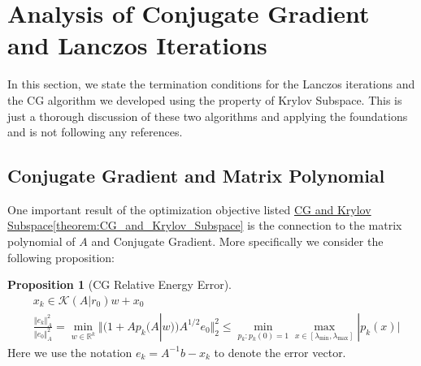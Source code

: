 \documentclass[]{article}
\theoremstyle{definition}
\newtheorem{prop}{Proposition}[section]  %
\begin{document}
\section{Analysis of Conjugate Gradient and Lanczos Iterations}
    In this section, we state the termination conditions for the Lanczos iterations and the CG algorithm we developed using the property of Krylov Subspace. This is just a thorough discussion of these two algorithms and applying the foundations and is not following any references.
    \subsection{Conjugate Gradient and Matrix Polynomial}
        One important result of the optimization objective listed \hyperref[theorem:CG_and_Krylov_Subspace]{CG and Krylov Subspace\ref*{theorem:CG_and_Krylov_Subspace}} is the connection to the matrix polynomial of $A$ and Conjugate Gradient. More specifically we consider the following proposition: 
        \begin{prop}[CG Relative Energy Error]\label{prop:CG_Relative_Energy Error}
            \begin{align}
                & x_k \in \mathcal{K}(A|r_0)w + x_0
                \\
                & \frac{\Vert e_k\Vert_A^2}{\Vert e_0\Vert_A^2}
                = 
                \min_{w\in \mathbb R^k} 
                \Vert
                    (1 + Ap_k(A|w))A^{1/2}e_0
                \Vert_2^2
                \le
                \min_{p_{k}: p_{k}(0) = 1}\max_{x\in [\lambda_{\text{min}}, \lambda_{\text{max}}
                ]} |p_k(x)|
            \end{align}
            Here we use the notation $e_k = A^{-1}b - x_k$ to denote the error vector. 
        \end{prop}
\end{document}
